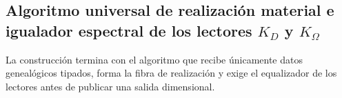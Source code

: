 
\endgroup
\begingroup
\let\chapter\section
\let\section\subsection
\let\subsection\subsubsection
\let\subsubsection\paragraph
\let\clearpage\relax

\endgroup

\section{Algoritmo universal de realización material e igualador espectral de los lectores \(K_D\) y \(K_\Omega\)}
La construcción termina con el algoritmo que recibe únicamente datos
genealógicos tipados, forma la fibra de realización y exige el equalizador de
los lectores antes de publicar una salida dimensional.

